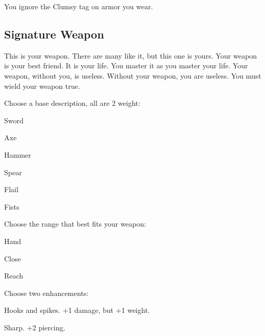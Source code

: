 You ignore the Clumsy tag on armor you wear.

           
\subsection{Signature Weapon}    
           

This is your weapon. There are many like it, but this one is yours. Your weapon is your best friend. It is your life. You master it as you master your life. Your weapon, without you, is useless. Without your weapon, you are useless. You must wield your weapon true.

           

Choose a base description, all are 2 weight:

           
\startitemize[1,packed]
             
\item Sword

             
\item Axe

             
\item Hammer

             
\item Spear

             
\item Flail

             
\item Fists

           
\stopitemize
           

Choose the range that best fits your weapon:

           
\startitemize[1,packed]
             
\item Hand

             
\item Close

             
\item Reach

           
\stopitemize
           

Choose two enhancements:

           
\startitemize[1,packed]
             
\item Hooks and spikes. +1 damage, but +1 weight.

             
\item Sharp. +2 piercing.

